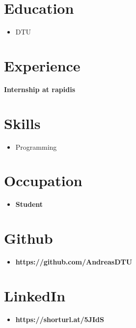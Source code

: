 \documentclass[lighthipster]{simplehipstercv}
\begin{document}
\begin{paracol}{2}
        \section*{Education}
        \begin{itemize}
                \item DTU
        \end{itemize}

        \section*{Experience}
        \textbf{Internship at rapidis}


        \section*{Skills}
        \begin{itemize}
                \item Programming
        \end{itemize}

        \vspace{3em}

        \section*{Occupation}
        \begin{itemize}
            \item \textbf{Student}
        \end{itemize}

        \section*{Github}
        \begin{itemize}
            \item \textbf{https://github.com/AndreasDTU}
        \end{itemize}

        \section*{LinkedIn}
        \begin{itemize}
            \item \textbf{https://shorturl.at/5JIdS}
        \end{itemize}

        \vfill{}
    \end{paracol}
\end{document}
